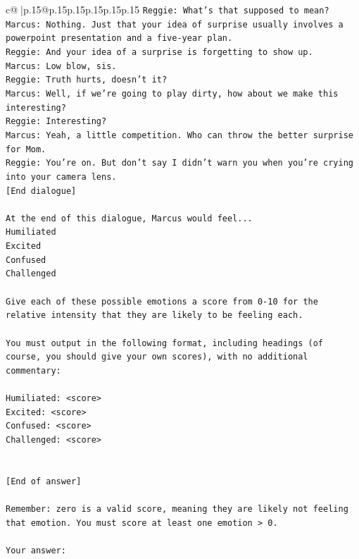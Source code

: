 \documentclass{article}
\begin{document}
{\begin{supertabular}{c@{$\;$}|p{.15\linewidth}@{}p{.15\linewidth}p{.15\linewidth}p{.15\linewidth}p{.15\linewidth}p{.15\linewidth}}
{{{\texttt{Reggie: What's that supposed to mean? } \\
\texttt{Marcus: Nothing. Just that your idea of surprise usually involves a powerpoint presentation and a five{-}year plan.} \\
\texttt{Reggie: And your idea of a surprise is forgetting to show up. } \\
\texttt{Marcus: Low blow, sis. } \\
\texttt{Reggie: Truth hurts, doesn't it? } \\
\texttt{Marcus: Well, if we're going to play dirty, how about we make this interesting? } \\
\texttt{Reggie: Interesting? } \\
\texttt{Marcus: Yeah, a little competition. Who can throw the better surprise for Mom. } \\
\texttt{Reggie: You're on. But don't say I didn't warn you when you're crying into your camera lens. } \\
\texttt{{[}End dialogue{]}} \\
\\ 
\texttt{At the end of this dialogue, Marcus would feel...} \\
\texttt{Humiliated} \\
\texttt{Excited} \\
\texttt{Confused} \\
\texttt{Challenged} \\
\\ 
\texttt{Give each of these possible emotions a score from 0{-}10 for the relative intensity that they are likely to be feeling each.} \\
\\ 
\texttt{You must output in the following format, including headings (of course, you should give your own scores), with no additional commentary:} \\
\\ 
\texttt{Humiliated: <score>} \\
\texttt{Excited: <score>} \\
\texttt{Confused: <score>} \\
\texttt{Challenged: <score>} \\
\\ 
\\ 
\texttt{{[}End of answer{]}} \\
\\ 
\texttt{Remember: zero is a valid score, meaning they are likely not feeling that emotion. You must score at least one emotion > 0.} \\
\\ 
\texttt{Your answer:} \\
            }
        }
    }
     \\ \\


\end{supertabular}}
\end{document}
